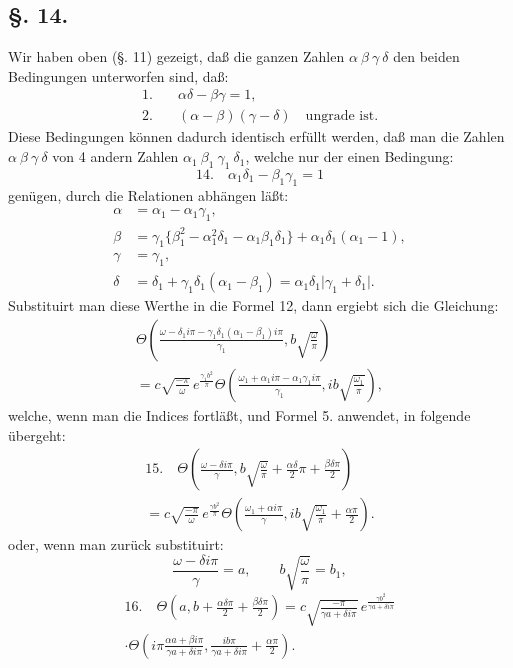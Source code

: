 \documentclass[10pt]{article}
\newcommand{\sourceanchor}[1]{\hypertarget{source-#1}{}}
\begin{document}
\subsection*{\S. 14.}
Wir haben oben (\S. 11) gezeigt, daß die ganzen Zahlen \(\alpha\ \beta\ \gamma\ \delta\) den beiden Bedingungen unterworfen sind, daß:
\begin{align*}
1.\quad&\alpha\delta-\beta\gamma=1,\\
2.\quad&(\alpha-\beta)(\gamma-\delta)\quad\text{ungrade ist.}
\end{align*}
Diese Bedingungen können dadurch identisch erfüllt werden, daß man die Zahlen \(\alpha\ \beta\ \gamma\ \delta\) von 4 andern Zahlen \(\alpha_1\ \beta_1\ \gamma_1\ \delta_1\), welche nur der einen Bedingung:
\begin{equation*}
14.\quad \alpha_1\delta_1-\beta_1\gamma_1=1
\end{equation*}
genügen, durch die Relationen abhängen läßt:
\begin{align*}
\alpha&=\alpha_1-\alpha_1\gamma_1,\\
\beta&=\gamma_1\{\beta_1^{2}-\alpha_1^{2}\delta_1-\alpha_1\beta_1\delta_1\}+\alpha_1\delta_1(\alpha_1-1),\\
\gamma&=\gamma_1,\\
\delta&=\delta_1+\gamma_1\delta_1(\alpha_1-\beta_1)=\alpha_1\delta_1\lvert\gamma_1+\delta_1\rvert.
\end{align*}
Substituirt man diese Werthe in die Formel 12, dann ergiebt sich die Gleichung:
\begin{multline*}
\Theta\!\left(\frac{\omega-\delta_1 i\pi-\gamma_1\delta_1(\alpha_1-\beta_1)i\pi}{\gamma_1}, b\sqrt{\frac{\omega}{\pi}}\right)\\
=c\sqrt{\frac{-\pi}{\omega}}\,e^{\frac{\gamma_1 b^{2}}{\pi}}
\Theta\!\left(\frac{\omega_1+\alpha_1 i\pi-\alpha_1\gamma_1 i\pi}{\gamma_1}, ib\sqrt{\frac{\omega_1}{\pi}}\right),
\end{multline*}
\sourceanchor{PA12}
welche, wenn man die Indices fortläßt, und Formel 5. anwendet, in folgende übergeht:
\begin{multline*}
15.\quad
\Theta\!\left(\frac{\omega-\delta i\pi}{\gamma}, b\sqrt{\frac{\omega}{\pi}}+\frac{\alpha\delta}{2}\pi+\frac{\beta\delta\pi}{2}\right)\\
=c\sqrt{\frac{-\pi}{\omega}}\,e^{\frac{\gamma b^{2}}{\pi}}
\Theta\!\left(\frac{\omega_1+\alpha i\pi}{\gamma}, ib\sqrt{\frac{\omega_1}{\pi}}+\frac{\alpha\pi}{2}\right).
\end{multline*}
oder, wenn man zurück substituirt:
\[
\frac{\omega-\delta i\pi}{\gamma}=a,
\qquad b\sqrt{\frac{\omega}{\pi}}=b_1,
\]
\begin{multline*}
16.\quad
\Theta\!\left(a,b+\frac{\alpha\delta\pi}{2}+\frac{\beta\delta\pi}{2}\right)
=c\sqrt{\frac{-\pi}{\gamma a+\delta i\pi}}\,e^{\frac{\gamma b^{2}}{\gamma a+\delta i\pi}}\\
\cdot\Theta\!\left(i\pi\frac{\alpha a+\beta i\pi}{\gamma a+\delta i\pi},\frac{ib\pi}{\gamma a+\delta i\pi}+\frac{\alpha\pi}{2}\right).
\end{multline*}
\end{document}
